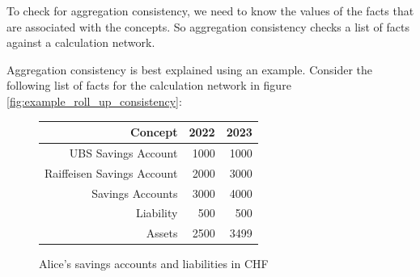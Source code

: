 To check for aggregation consistency, we need to know the values of the facts that are associated with the concepts.
So aggregation consistency checks a list of facts against a calculation network.

Aggregation consistency is best explained using an example.
Consider the following list of facts for the calculation network in figure \ref{fig:example_roll_up_consistency}:


\begin{figure}[H]
    \caption{Alice's savings accounts and liabilities in CHF}
    \label{fig:example_facts_aggregation_consistency}
    \centering 
    \begin{tabular}{|r|r|r|}
        \hline
        \textbf{Concept} & \textbf{2022} & \textbf{2023} \\ \hline
        UBS Savings Account & 1000 & 1000 \\ \hline
        Raiffeisen Savings Account & 2000 & 3000 \\ \hline
        Savings Accounts & 3000 & 4000 \\ \hline
        Liability & 500 & 500 \\ \hline
        Assets & 2500 & 3499 \\ \hline
    \end{tabular}
\end{figure}


